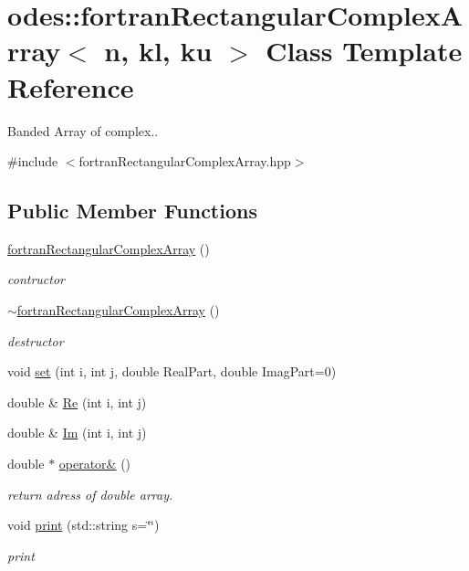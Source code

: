 \hypertarget{classodes_1_1fortranRectangularComplexArray}{}\section{odes\+:\+:fortran\+Rectangular\+Complex\+Array$<$ n, kl, ku $>$ Class Template Reference}
\label{classodes_1_1fortranRectangularComplexArray}


Banded Array of complex..  




{\ttfamily \#include $<$fortran\+Rectangular\+Complex\+Array.\+hpp$>$}

\subsection*{Public Member Functions}
\begin{DoxyCompactItemize}
\item 
\hyperlink{classodes_1_1fortranRectangularComplexArray_a3350b7de9dcc01f0384bc676f7945680}{fortran\+Rectangular\+Complex\+Array} ()
\begin{DoxyCompactList}\small\item\em contructor \end{DoxyCompactList}\item 
\hyperlink{classodes_1_1fortranRectangularComplexArray_a3279352a8670d9606569870563b3396e}{$\sim$fortran\+Rectangular\+Complex\+Array} ()
\begin{DoxyCompactList}\small\item\em destructor \end{DoxyCompactList}\item 
void \hyperlink{classodes_1_1fortranRectangularComplexArray_a0afbfc5d739ef869582edcf28367402b}{set} (int i, int j, double Real\+Part, double Imag\+Part=0)
\item 
double \& \hyperlink{classodes_1_1fortranRectangularComplexArray_aac1f6f911dcd3b2acc8bb231d451be3d}{Re} (int i, int j)
\item 
double \& \hyperlink{classodes_1_1fortranRectangularComplexArray_abbb4a814d9b0f6305a90533d6ecccdc8}{Im} (int i, int j)
\item 
double $\ast$ \hyperlink{classodes_1_1fortranRectangularComplexArray_afa636966bb08ef793ffca369bea73cc2}{operator\&} ()
\begin{DoxyCompactList}\small\item\em return adress of double array. \end{DoxyCompactList}\item 
void \hyperlink{classodes_1_1fortranRectangularComplexArray_a8d912a7c2f32484a031e30aa95360fff}{print} (std\+::string s=\char`\"{}\char`\"{})
\begin{DoxyCompactList}\small\item\em print \end{DoxyCompactList}\end{DoxyCompactItemize}
